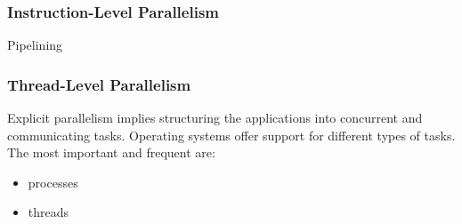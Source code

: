 \subsubsection{Instruction-Level Parallelism}
Pipelining

\subsubsection{Thread-Level Parallelism}
Explicit parallelism implies structuring the applications into concurrent and communicating tasks.
Operating systems offer support for different types of tasks.
The most important and frequent are:
\begin{itemize}
    \item processes
    \item threads
\end{itemize}

